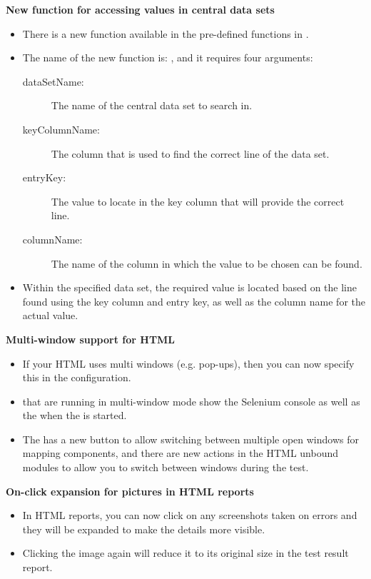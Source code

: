\textbf{New function for accessing values in central data sets}
\begin{itemize}
\item There is a new function available in the pre-defined functions in \app{}.
\item The name of the new function is: , and it requires four arguments:
\begin{description}
\item [dataSetName:]{The name of the central data set to search in.}
\item [keyColumnName:]{The column that is used to find the correct line of the data set.}
\item [entryKey:]{The value to locate in the key column that will provide the correct line.}
\item [columnName:]{The name of the column in which the value to be chosen can be found.}
\end{description}
\item Within the specified data set, the required value is located based on the line found using the key column and entry key, as well as the column name for the actual value. 
\end{itemize}

\textbf{Multi-window support for HTML \gdauts{}}
\begin{itemize}
\item If your HTML \gdaut{} uses multi windows (e.g. pop-ups), then you can now specify this in the \gdaut{} configuration. 
\item \gdauts{} that are running in multi-window mode show the Selenium console as well as the \gdaut{} when the \gdaut{} is started. 
\item The \gdomeditor{} has a new button to allow switching between multiple open windows for mapping components, and there are new actions in the HTML unbound modules to allow you to switch between windows during the test. 
\end{itemize}

\textbf{On-click expansion for pictures in HTML reports}
\begin{itemize}
\item In HTML reports, you can now click on any screenshots taken on errors and they will be expanded to make the details more visible.
\item Clicking the image again will reduce it to its original size in the test result report.
\end{itemize}

